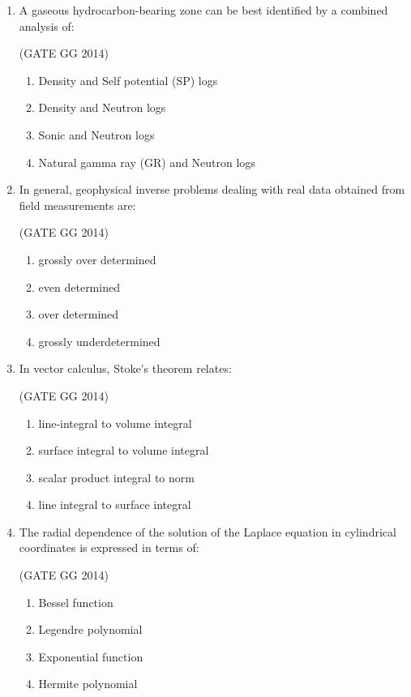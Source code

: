 \documentclass[journal]{IEEEtran}
\begin{document}
\begin{enumerate}[start=26]
    \item A gaseous hydrocarbon-bearing zone can be best identified by a combined analysis of:
    
\hfill(GATE GG 2014)
\begin{enumerate}
    \item Density and Self potential (SP) logs
    \item Density and Neutron logs
    \item Sonic and Neutron logs
    \item Natural gamma ray (GR) and Neutron logs
\end{enumerate}

\item In general, geophysical inverse problems dealing with real data obtained from field measurements are:

\hfill(GATE GG 2014)
\begin{multicols}{2}
    \begin{enumerate}
    \item grossly over determined
    \item even determined
    \item over determined
    \item grossly underdetermined
\end{enumerate}
\end{multicols}

\item In vector calculus, Stoke's theorem relates:

\hfill(GATE GG 2014)
\begin{multicols}{2}
    \begin{enumerate}
    \item line-integral to volume integral
    \item surface integral to volume integral
    \item scalar product integral to norm
    \item line integral to surface integral
\end{enumerate}
\end{multicols}

\item The radial dependence of the solution of the Laplace equation in cylindrical coordinates is expressed in terms of:

\hfill(GATE GG 2014)
\begin{multicols}{2}
    \begin{enumerate}
    \item Bessel function
    \item Legendre polynomial
    \item Exponential function
    \item Hermite polynomial
\end{enumerate}
\end{multicols}


\end{enumerate}
\end{document}
